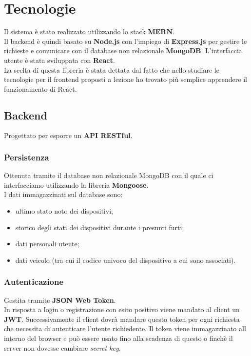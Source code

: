 \documentclass{report}
\begin{document}
\section{Tecnologie}
Il sistema è stato realizzato utilizzando lo stack \textbf{MERN}.\\
Il backend è quindi basato su \textbf{Node.js} con l'impiego di \textbf{Express.js} per gestire le richieste e comunicare con il database non relazionale \textbf{MongoDB}. L'interfaccia utente è stata sviluppata con \textbf{React}.\\
La scelta di questa libreria è stata dettata dal fatto che nello studiare le tecnologie per il frontend proposti a lezione ho trovato più semplice apprendere il funzionamento di React.

\subsection{Backend}
Progettato per esporre un \textbf{API RESTful}.
\subsubsection{Persistenza}
Ottenuta tramite il database non relazionale MongoDB con il quale ci interfacciamo utilizzando la libreria \textbf{Mongoose}.\\
I dati immagazzinati sul database sono:
\begin{itemize}
    \item ultimo stato noto dei dispositivi;
    \item storico degli stati dei dispositivi durante i presunti furti;
    \item dati personali utente;
    \item dati veicolo (tra cui il codice univoco del dispositivo a cui sono associati).
\end{itemize}

\subsubsection{Autenticazione}
Gestita tramite \textbf{JSON Web Token}.\\
In risposta a login o registrazione con esito positivo viene mandato al client un \textbf{JWT}. Successivamente il client dovrà mandare questo token per ogni richiesta che necessita di autenticare l'utente richiedente. Il token viene immagazzinato all interno del browser e può essere usato fino alla scadenza di questo o finchè il server non dovesse cambiare \textit{secret key}.
\end{document}
